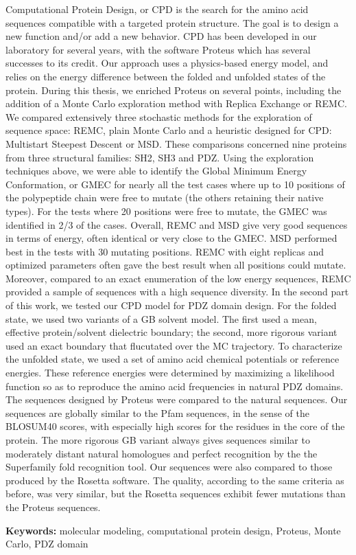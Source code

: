 \bigskip
Computational Protein Design, or CPD is the search for the amino acid sequences compatible with a targeted protein structure. The goal is to design a new function and/or add a new behavior. CPD has been developed in our laboratory for several years, with the software Proteus which has several successes to its credit. Our approach uses a physics-based energy model, and relies on the energy difference between the folded and unfolded states of the protein. During this thesis, we enriched Proteus on several points, including the addition of a Monte Carlo exploration method with Replica Exchange or REMC. We compared extensively three stochastic methods for the exploration of sequence space: REMC, plain Monte Carlo and a heuristic designed for CPD: Multistart Steepest Descent or MSD. These comparisons concerned nine proteins from three structural families: SH2, SH3 and PDZ. Using the exploration techniques above, we were able to identify the Global Minimum Energy Conformation, or GMEC for nearly all the test cases where up to 10 positions of the polypeptide chain were free to mutate (the others retaining their native types). For the tests where 20 positions were free to mutate, the GMEC was identified in 2/3 of the cases. Overall, REMC and MSD give very good sequences in terms of energy, often identical or very close to the GMEC. MSD performed best in the tests with 30 mutating positions. REMC with eight replicas and optimized parameters often gave the best result when all positions could mutate. Moreover, compared to an exact enumeration of the low energy sequences, REMC provided a sample of sequences with a high sequence diversity.
     In the second part of this work, we tested our CPD model for PDZ domain design. For the folded state, we used two variants of a GB solvent model. The first used a mean, effective protein/solvent dielectric boundary; the second, more rigorous variant used an exact boundary that flucutated over the MC trajectory. To characterize the unfolded state, we used a set of amino acid chemical potentials or reference energies. These reference energies were determined by maximizing a likelihood function so as to reproduce the amino acid frequencies in natural PDZ domains. The sequences designed by Proteus were compared to the natural sequences. Our sequences are globally similar to the Pfam sequences, in the sense of the BLOSUM40 scores, with especially high scores for the residues in the core of the protein. The more rigorous GB variant always gives sequences similar to moderately distant natural homologues and perfect recognition by the the Superfamily fold recognition tool. Our sequences were also compared to those produced by the Rosetta software. The quality, according to the same criteria as before, was very similar, but the Rosetta sequences exhibit fewer mutations than the Proteus sequences.



\bigskip

\textbf{Keywords:} molecular modeling, computational protein design, Proteus, Monte Carlo, PDZ domain







